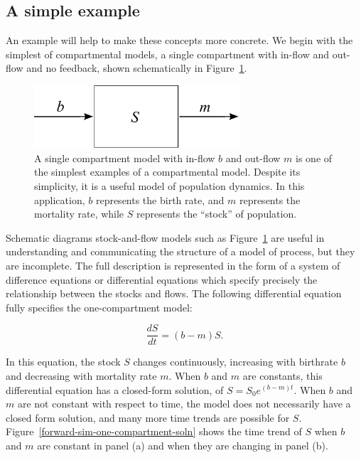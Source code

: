 \subsection{A simple example}

An example will help to make these concepts more concrete.  We begin with the simplest of compartmental models, a single compartment with in-flow and out-flow and no feedback, shown schematically in Figure~\ref{forward-sim-one-compartment}.

\begin{figure}[h]
\begin{center}
\includegraphics[width=3in]{S.pdf}
\caption{A single compartment model with in-flow $b$ and out-flow $m$ is one of the simplest examples of a compartmental model. Despite its simplicity, it is a useful model of population dynamics.  In this application, $b$ represents the birth rate, and $m$ represents the mortality rate, while $S$ represents the ``stock'' of population.}
\label{forward-sim-one-compartment}
\end{center}
\end{figure}


Schematic diagrams stock-and-flow models such as Figure~\ref{forward-sim-one-compartment} are useful in understanding and communicating the structure of a model of process, but they are incomplete. The full description is represented in the form of a system of difference equations or differential equations which specify precisely the relationship between the stocks and flows. The following differential equation fully specifies the one-compartment model:

\[
\frac{dS}{dt} = (b - m)S.
\]

In this equation, the stock $S$ changes continuously, increasing with birthrate $b$ and decreasing with mortality rate $m$. When $b$ and $m$ are constants, this differential equation has a closed-form solution, of $S = S_0 e^{(b-m)t}$. When $b$ and $m$ are not constant with respect to time, the model does not necessarily have a closed form solution, and many more time trends are possible for $S$.  Figure~\ref{forward-sim-one-compartment-soln} shows the time trend of $S$ when $b$ and $m$ are constant in panel (a) and when they are changing in panel (b).

